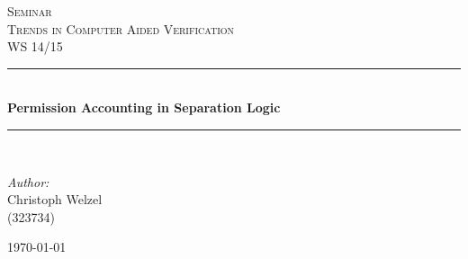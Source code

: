 \documentclass{scrartcl}
\theoremstyle{definition}
\theoremstyle{proof}
\begin{document}
\begin{titlepage}

\begin{center}


\textsc{\Large Seminar}\\
\textsc{\Large Trends in Computer Aided Verification}\\[0.3cm]
\textsc{\Large WS 14/15}\\[0.3cm]

\newcommand{\HRule}{\rule{\linewidth}{0.5mm}}
\HRule \\[0.4cm]
{ \huge \bfseries Permission Accounting in Separation Logic}\\[0.4cm]

\HRule \\[3.5cm]

	\begin{minipage}{0.4\textwidth}
		\begin{flushleft} \large
			\emph{Author:}\\
			Christoph Welzel\\
			(323734)
		\end{flushleft}
	\end{minipage}
\hfill
	\begin{minipage}{0.4\textwidth}
		\begin{flushright} \large
		\end{flushright}
	\end{minipage}

\vfill

{\large \today}

\end{center}

\end{titlepage}
\setcounter{page}{1}

\tableofcontents











\end{document}
